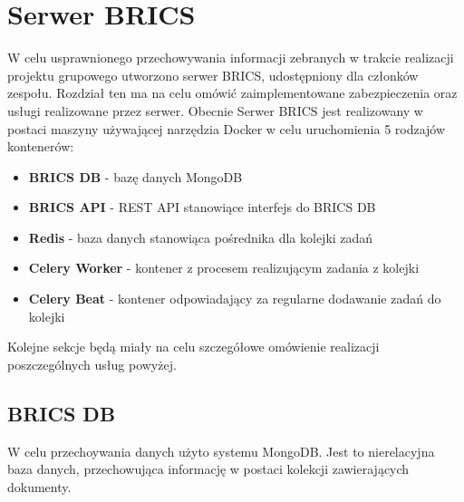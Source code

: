 \chapter{Serwer BRICS}
	W celu usprawnionego przechowywania informacji zebranych w trakcie realizacji projektu grupowego utworzono serwer BRICS, udostępniony dla członków zespołu. Rozdział ten ma na celu omówić zaimplementowane zabezpieczenia oraz usługi realizowane przez serwer.
	Obecnie Serwer BRICS jest realizowany w postaci maszyny używającej narzędzia Docker w celu uruchomienia 5 rodzajów kontenerów: 
	\begin{itemize}
		\item {\textbf{BRICS DB} - bazę danych MongoDB}
		\item {\textbf{BRICS API} - REST API stanowiące interfejs do BRICS DB}
		\item {\textbf{Redis} - baza danych stanowiąca pośrednika dla kolejki zadań}
		\item{\textbf{Celery Worker} - kontener z procesem realizującym zadania z kolejki}
		\item{\textbf{Celery Beat} - kontener odpowiadający za regularne dodawanie zadań do kolejki}
	\end{itemize}
	
	Kolejne sekcje będą miały na celu szczegółowe omówienie realizacji poszczególnych usług powyżej.
	
	\section {BRICS DB}
	W celu przechoywania danych użyto systemu MongoDB. Jest to nierelacyjna baza danych, przechowująca informację w postaci kolekcji zawierających dokumenty.
	
